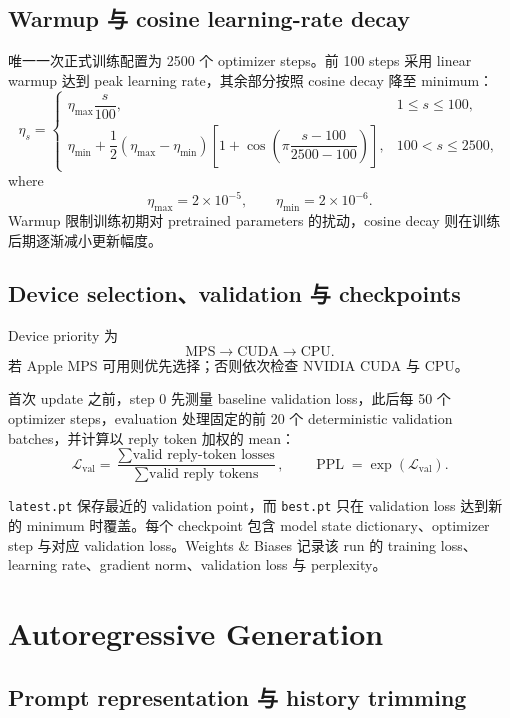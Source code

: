 \documentclass[12pt]{article}
\begin{document}
\subsection{Warmup 与 cosine learning-rate decay}

唯一一次正式训练配置为 2500 个 optimizer steps。前 100 steps 采用 linear warmup 达到 peak learning rate，其余部分按照 cosine decay 降至 minimum：
\begin{equation}
\eta_s=
\begin{cases}
\eta_{\max}\dfrac{s}{100},&1\leq s\leq100,\\[6pt]
\eta_{\min}+\dfrac12(\eta_{\max}-\eta_{\min})
\left[1+\cos\left(\pi\dfrac{s-100}{2500-100}\right)\right],
&100<s\leq2500,
\end{cases}
\end{equation}
where
\[
\eta_{\max}=2\times10^{-5},
\qquad
\eta_{\min}=2\times10^{-6}.
\]
Warmup 限制训练初期对 pretrained parameters 的扰动，cosine decay 则在训练后期逐渐减小更新幅度。

\subsection{Device selection、validation 与 checkpoints}

Device priority 为
\[
\mathrm{MPS}\rightarrow\mathrm{CUDA}\rightarrow\mathrm{CPU}.
\]
若 Apple MPS 可用则优先选择；否则依次检查 NVIDIA CUDA 与 CPU。

首次 update 之前，step 0 先测量 baseline validation loss，此后每 50 个 optimizer steps，evaluation 处理固定的前 20 个 deterministic validation batches，并计算以 reply token 加权的 mean：
\begin{equation}
\mathcal L_{\mathrm{val}}
=\frac{\sum\text{valid reply-token losses}}
{\sum\text{valid reply tokens}},
\qquad
\operatorname{PPL}=\exp(\mathcal L_{\mathrm{val}}).
\end{equation}

\texttt{latest.pt} 保存最近的 validation point，而 \texttt{best.pt} 只在 validation loss 达到新的 minimum 时覆盖。每个 checkpoint 包含 model state dictionary、optimizer step 与对应 validation loss。Weights \& Biases 记录该 run 的 training loss、learning rate、gradient norm、validation loss 与 perplexity。

\section{Autoregressive Generation}

\subsection{Prompt representation 与 history trimming}
\end{document}
